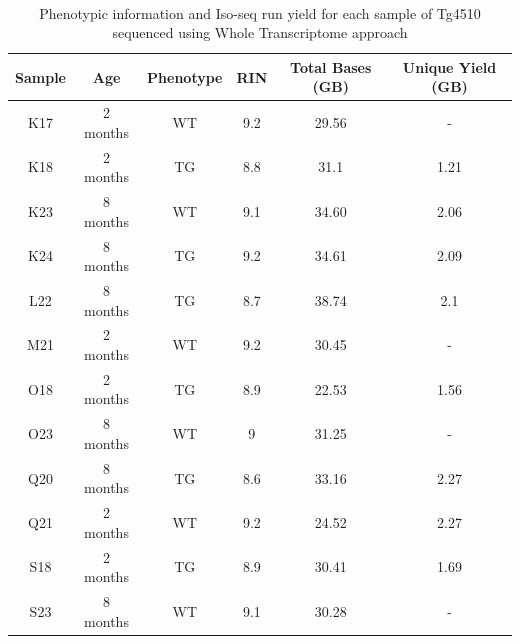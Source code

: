 \
\begin{table}[h]
	\begin{tabularx}{1\textwidth}{cccccc}
		\toprule
		Sample & Age      & Phenotype & RIN & Total Bases (GB) & Unique Yield (GB) \\ \midrule
		K17    & 2 months & WT   & 9.2 & 29.56            & -                           \\
		K18    & 2 months & TG   & 8.8 & 31.1             & 1.21                        \\
		K23    & 8 months & WT   & 9.1 & 34.60            & 2.06                        \\
		K24    & 8 months & TG   & 9.2 & 34.61            & 2.09                        \\
		L22    & 8 months & TG   & 8.7 & 38.74            & 2.1                         \\
		M21    & 2 months & WT   & 9.2 & 30.45            & -                           \\
		O18    & 2 months & TG   & 8.9 & 22.53            & 1.56                        \\
		O23    & 8 months & WT   & 9   & 31.25            & -                           \\
		Q20    & 8 months & TG   & 8.6 & 33.16            & 2.27                        \\
		Q21    & 2 months & WT   & 9.2 & 24.52            & 2.27                        \\
		S18    & 2 months & TG   & 8.9 & 30.41            & 1.69                        \\
		S23     & 8 months & WT   & 9.1 & 30.28            & -                          \\ \bottomrule
	\end{tabularx}
	\caption[Run Yield Output from Whole Transcriptome Iso-Seq of Tg4510]%
	{Phenotypic information and Iso-seq run yield for each sample of Tg4510 sequenced using Whole Transcriptome approach}
	\label{tab:isoseq_wholerun_output}
\end{table}

